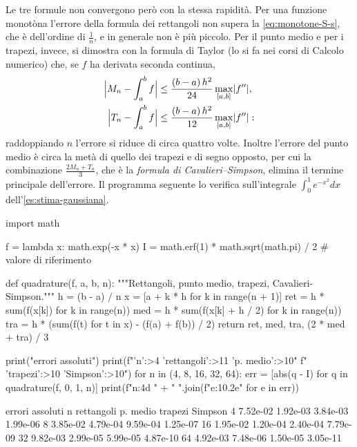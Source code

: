 Le tre formule non convergono però con la stessa rapidità. Per una funzione monotòna
l'errore della formula dei rettangoli non supera la \eqref{eq:monotone-S-s}, che è
dell'ordine di $\frac1n$, e in generale non è più piccolo. Per il punto medio e per i
trapezi, invece, si dimostra con la formula di Taylor (lo si fa nei corsi di Calcolo
numerico) che, se $f$ ha derivata seconda continua,
\begin{equation}\label{eq:errori-quadratura}
\begin{aligned}
  \Bigl|M_{n}-\int_{a}^{b}f\Bigr|&\le\frac{(b-a)\,h^{2}}{24}\max_{[a,b]}\lvert f''\rvert,\\
  \Bigl|T_{n}-\int_{a}^{b}f\Bigr|&\le\frac{(b-a)\,h^{2}}{12}\max_{[a,b]}\lvert f''\rvert :
\end{aligned}
\end{equation}
raddoppiando $n$ l'errore si riduce di circa quattro volte. Inoltre l'errore del punto
medio è circa la metà di quello dei trapezi e di segno opposto, per cui la combinazione
$\frac{2M_{n}+T_{n}}3$, che è la \emph{formula di Cavalieri--Simpson}, elimina il termine
principale dell'errore. Il programma seguente lo verifica sull'integrale
$\int_{0}^{1}e^{-x^{2}}dx$ dell'\cref{es:stima-gaussiana}.

\begin{python}
import math

f = lambda x: math.exp(-x * x)
I = math.erf(1) * math.sqrt(math.pi) / 2     # valore di riferimento

def quadrature(f, a, b, n):
    """Rettangoli, punto medio, trapezi, Cavalieri-Simpson."""
    h = (b - a) / n
    x = [a + k * h for k in range(n + 1)]
    ret = h * sum(f(x[k]) for k in range(n))
    med = h * sum(f(x[k] + h / 2) for k in range(n))
    tra = h * (sum(f(t) for t in x) - (f(a) + f(b)) / 2)
    return ret, med, tra, (2 * med + tra) / 3

print("errori assoluti")
print(f"{'n':>4} {'rettangoli':>11} {'p. medio':>10}"
      f" {'trapezi':>10} {'Simpson':>10}")
for n in (4, 8, 16, 32, 64):
    err = [abs(q - I) for q in quadrature(f, 0, 1, n)]
    print(f"{n:4d} " + " ".join(f"{e:10.2e}" for e in err))
\end{python}
\begin{risultato}
errori assoluti
   n  rettangoli   p. medio    trapezi    Simpson
   4   7.52e-02   1.92e-03   3.84e-03   1.99e-06
   8   3.85e-02   4.79e-04   9.59e-04   1.25e-07
  16   1.95e-02   1.20e-04   2.40e-04   7.79e-09
  32   9.82e-03   2.99e-05   5.99e-05   4.87e-10
  64   4.92e-03   7.48e-06   1.50e-05   3.05e-11
\end{risultato}

